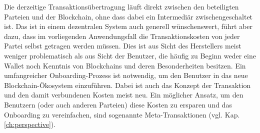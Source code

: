 Die derzeitige Transaktionsübertragung läuft direkt zwischen den beteiligten Parteien und der Blockchain, ohne dass dabei ein Intermediär zwischengeschaltet ist. Das ist in einem dezentralen System auch generell wünschenswert, führt aber dazu, dass im vorliegenden Anwendungsfall die Transaktionskosten von jeder Partei selbst getragen werden müssen. Dies ist aus Sicht des Herstellers meist weniger problematisch als aus Sicht der Benutzer, die häufig zu Beginn weder eine Wallet noch Kenntnis von Blockchains und deren Besonderheiten besitzen. Ein umfangreicher Onboarding-Prozess ist notwendig, um den Benutzer in das neue Blockchain-Ökosystem einzuführen. Dabei ist auch das Konzept der Transaktion und den damit verbundenen Kosten meist neu. Ein möglicher Ansatz, um den Benutzern (oder auch anderen Parteien) diese Kosten zu ersparen und das Onboarding zu vereinfachen, sind sogenannte Meta-Transaktionen (vgl. Kap. \ref{ch:perspective}).


